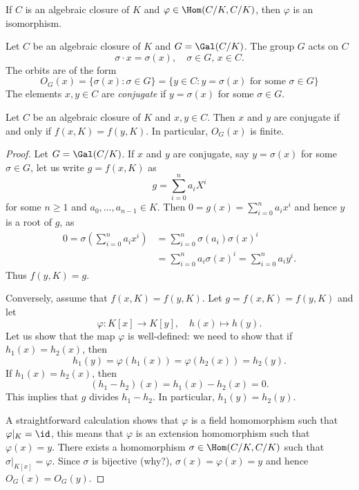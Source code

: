 \begin{exercise}
\label{xca:C/K_bijective}
If $C$ is an algebraic closure of $K$ and 
$\varphi\in\Hom(C/K,C/K)$, 
then $\varphi$ is an isomorphism. 
\end{exercise}


Let $C$ be an algebraic closure of $K$ and 
$G=\Gal(C/K)$. The group $G$ acts on $C$
\[
\sigma\cdot x=\sigma(x),\quad
\sigma\in G,\,x\in C.
\]
The orbits 
are of the form 
\[
O_G(x)=\{\sigma(x):\sigma\in G\}
=\{y\in C:y=\sigma(x)\text{ for some $\sigma\in G$}\}
\]
The elements $x,y\in C$ are \emph{conjugate} 
if $y=\sigma(x)$ for some $\sigma\in G$. 

\begin{proposition}
\label{pro:conjugate}
    Let $C$ be an algebraic closure of $K$ and $x,y\in C$. Then 
    $x$ and $y$ are conjugate if and only if $f(x,K)=f(y,K)$. In particular, 
    $O_G(x)$ is finite. 
\end{proposition}

\begin{proof}
    Let $G=\Gal(C/K)$. 
    If $x$ and $y$ are conjugate, say $y=\sigma(x)$ for some $\sigma\in G$, 
    let us write $g=f(x,K)$ as 
    \[
    g=\sum_{i=0}^{n} a_iX^i
    \]
    for some $n\geq1$ and $a_0,\dots,a_{n-1}\in K$. 
    Then $0=g(x)=\sum_{i=0}^{n}a_ix^i$ and hence $y$ is
    a root of $g$, as 
    \begin{align*}
    0=\sigma\left(\sum_{i=0}^{n}a_ix^i\right)
    &=\sum_{i=0}^{n}\sigma(a_i)\sigma(x)^i\\
    &=\sum_{i=0}^{n}a_i\sigma(x)^i
    =\sum_{i=0}^{n}a_iy^i.
    \end{align*}
    Thus $f(y,K)=g$. 
    
    Conversely, assume that $f(x,K)=f(y,K)$. Let
    $g=f(x,K)=f(y,K)$ and let 
    \[
    \varphi\colon K[x]\to K[y],
    \quad
    h(x)\mapsto h(y).
    \]
    Let us show that the map $\varphi$ is well-defined: we need to show 
    that if 
    $h_1(x)=h_2(x)$, then 
    \[
    h_1(y)=\varphi(h_1(x))=\varphi(h_2(x))=h_2(y).
    \]
    If $h_1(x)=h_2(x)$, then 
    \[
    (h_1-h_2)(x)=h_1(x)-h_2(x)=0.
    \]
    This implies
    that $g$ divides $h_1-h_2$. In particular, $h_1(y)=h_2(y)$.
    
    A straightforward calculation shows that $\varphi$ is a field 
    homomorphism such that $\varphi|_K=\id$, this means that
    $\varphi$ is 
    an extension homomorphism such that $\varphi(x)=y$. There exists a homomorphism 
    $\sigma\in\Hom(C/K,C/K)$ such that 
    $\sigma|_{K[x]}=\varphi$. Since $\sigma$ is bijective 
    (why?), 
    $\sigma(x)=\varphi(x)=y$ and hence 
    $O_G(x)=O_G(y)$. 
\end{proof}

